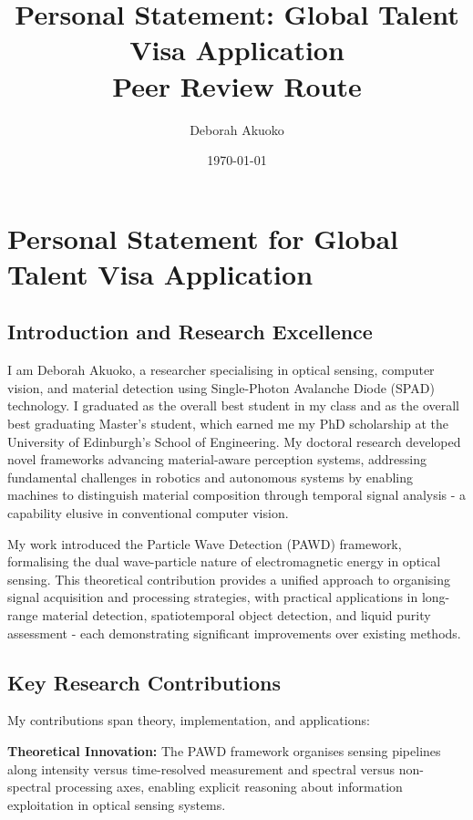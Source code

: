 \documentclass[12pt,a4paper]{article}
\title{Personal Statement: Global Talent Visa Application\\
Peer Review Route}
\author{Deborah Akuoko}
\date{\today}
\begin{document}
\maketitle
\thispagestyle{empty}
\newpage

\section*{Personal Statement for Global Talent Visa Application}

\subsection*{Introduction and Research Excellence}

I am Deborah Akuoko, a researcher specialising in optical sensing, computer vision, and material detection using Single-Photon Avalanche Diode (SPAD) technology. I graduated as the overall best student in my class and as the overall best graduating Master's student, which earned me my PhD scholarship at the University of Edinburgh's School of Engineering. My doctoral research developed novel frameworks advancing material-aware perception systems, addressing fundamental challenges in robotics and autonomous systems by enabling machines to distinguish material composition through temporal signal analysis - a capability elusive in conventional computer vision.

My work introduced the Particle Wave Detection (PAWD) framework, formalising the dual wave-particle nature of electromagnetic energy in optical sensing. This theoretical contribution provides a unified approach to organising signal acquisition and processing strategies, with practical applications in long-range material detection, spatiotemporal object detection, and liquid purity assessment - each demonstrating significant improvements over existing methods.

\subsection*{Key Research Contributions}

My contributions span theory, implementation, and applications:

\textbf{Theoretical Innovation:} The PAWD framework organises sensing pipelines along intensity versus time-resolved measurement and spectral versus non-spectral processing axes, enabling explicit reasoning about information exploitation in optical sensing systems.
\end{document}
